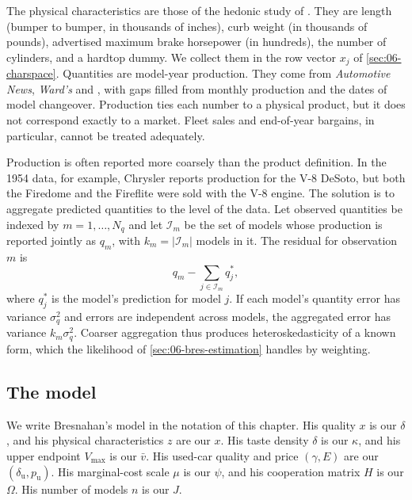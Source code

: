 The physical characteristics are those of the hedonic study of \citet{OhtaGriliches1976}. They are length (bumper
to bumper, in thousands of inches), curb weight (in thousands of pounds), advertised maximum brake horsepower (in
hundreds), the number of cylinders, and a hardtop dummy. We collect them in the row vector $x_j$ of
\cref{sec:06-charspace}. Quantities are model-year production. They come from \emph{Automotive News},
\emph{Ward's} and \citet{Heasley1977}, with gaps filled from monthly production and the dates of model changeover.
Production ties each number to a physical product, but it does not correspond exactly to a market. Fleet sales and
end-of-year bargains, in particular, cannot be treated adequately.

Production is often reported more coarsely than the product definition. In the 1954 data, for example, Chrysler
reports production for the V-8 DeSoto, but both the Firedome and the Fireflite were sold with the V-8 engine. The
solution is to aggregate predicted quantities to the level of the data. Let observed quantities be indexed by
$m = 1,\dots,N_q$ and let $\mathcal I_m$ be the set of models whose production is reported jointly as $q_m$, with
$k_m = |\mathcal I_m|$ models in it. The residual for observation $m$ is
\begin{equation}\label{eq:06-bres-aggregation}
  q_m - \sum_{j\in\mathcal I_m} q_j^*,
\end{equation}
where $q_j^*$ is the model's prediction for model $j$. If each model's quantity error has variance $\sigma_q^2$
and errors are independent across models, the aggregated error has variance $k_m\sigma_q^2$. Coarser aggregation
thus produces heteroskedasticity of a known form, which the likelihood of \cref{sec:06-bres-estimation} handles by
weighting.

\subsection{The model}\label{sec:06-bres-model}

We write Bresnahan's model in the notation of this chapter. His quality $x$ is our $\delta$, and his physical
characteristics $z$ are our $x$. His taste density $\delta$ is our $\kappa$, and his upper endpoint $V_{\max}$ is our
$\bar v$. His used-car quality and price $(\gamma, E)$ are our $(\delta_{\mathrm u}, p_{\mathrm u})$. His
marginal-cost scale $\mu$ is our $\psi$, and his cooperation matrix $H$ is our $\Omega$. His number of models $n$ is
our $J$.

